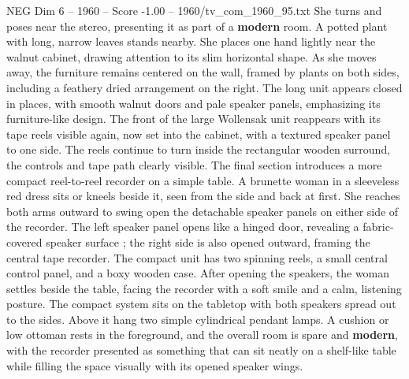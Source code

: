 \begin{textsample}{NEG Dim 6 – 1960 – Score -1.00 – 1960/tv\_com\_1960\_95.txt}
She turns and poses near the stereo, presenting it as part of a \textbf{modern} room.
A potted plant with long, narrow leaves stands nearby.
She places one hand lightly near the walnut cabinet, drawing attention to its slim horizontal shape.
As she moves away, the furniture remains centered on the wall, framed by plants on both sides, including a feathery dried arrangement on the right.
The long unit appears closed in places, with smooth walnut doors and pale speaker panels, emphasizing its furniture-like design.
The front of the large Wollensak unit reappears with its tape reels visible again, now set into the cabinet, with a textured speaker panel to one side.
The reels continue to turn inside the rectangular wooden surround, the controls and tape path clearly visible.
The final section introduces a more compact reel-to-reel recorder on a simple table.
A brunette woman in a sleeveless red dress sits or kneels beside it, seen from the side and back at first.
She reaches both arms outward to swing open the detachable speaker panels on either side of the recorder.
The left speaker panel opens like a hinged door, revealing a fabric-covered speaker surface ; the right side is also opened outward, framing the central tape recorder.
The compact unit has two spinning reels, a small central control panel, and a boxy wooden case.
After opening the speakers, the woman settles beside the table, facing the recorder with a soft smile and a calm, listening posture.
The compact system sits on the tabletop with both speakers spread out to the sides.
Above it hang two simple cylindrical pendant lamps.
A cushion or low ottoman rests in the foreground, and the overall room is spare and \textbf{modern}, with the recorder presented as something that can sit neatly on a shelf-like table while filling the space visually with its opened speaker wings.

\end{textsample}
